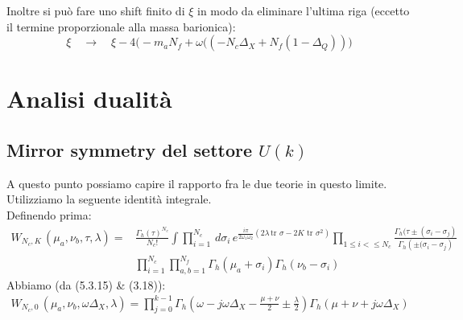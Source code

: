 \documentclass[a4paper,12pt]{article}
\begin{document}
Inoltre si può fare uno shift finito di $\xi$ in modo da eliminare l'ultima riga (eccetto il termine proporzionale alla massa barionica):
\begin{equation}
\xi \quad \longrightarrow \quad \xi - 4 \big( -m_a N_f + \omega ( ( -N_c \Delta_X + N_f ( 1 - \Delta_Q)) \big)
\end{equation}
 
\section{Analisi dualità}
\subsection{Mirror symmetry del settore $U(k)$}
A questo punto possiamo capire il rapporto fra le due teorie in questo limite.
Utilizziamo la seguente identità integrale.\\
Definendo prima:
\begin{align*}
W_{N_c , K } \, ( \mu_a, \nu_b , \tau, \lambda ) = & \frac{\Gamma_h (\tau)^{N_c}}{N_c !}
\int \prod_{i=1}^{N_c} \, d \sigma_i \, e^{ \frac{i \pi}{2 \omega_1 \omega_2} \left( 2 \lambda
\, \mbox{tr } \sigma - 2 K \mbox{ tr } \sigma^2 \right)} \prod_{1 \leq i < \leq N_c}
\frac{ \Gamma_h ( \tau \pm ( \sigma_i - \sigma_j) }{ \Gamma_h  \left( \pm (\sigma_i - \sigma_j \right) } \\
&  \prod_{i=1}^{N_c} \prod_{a,b=1}^{N_f} \Gamma_h ( \mu_a + \sigma_i) \Gamma_h(\nu_b- \sigma_i)
\end{align*} 
Abbiamo (da \citep{vanDeBult:2007}(5.3.15) \& \citep{Amariti:2014iza}(3.18)):
\begin{align}
W_{N_c , 0 } \, ( \mu_a, \nu_b , \omega \Delta_X, \lambda )  = \prod_{j=0}^{k-1} \Gamma_h \left( \omega  - j \omega \Delta_X  - \frac{\mu+\nu}{2} \pm \frac{\lambda}{2} \right) 
\Gamma_h \left( \mu + \nu + j \omega \Delta_X \right)
\label{dualization-mirror}
\end{align}
\end{document}
